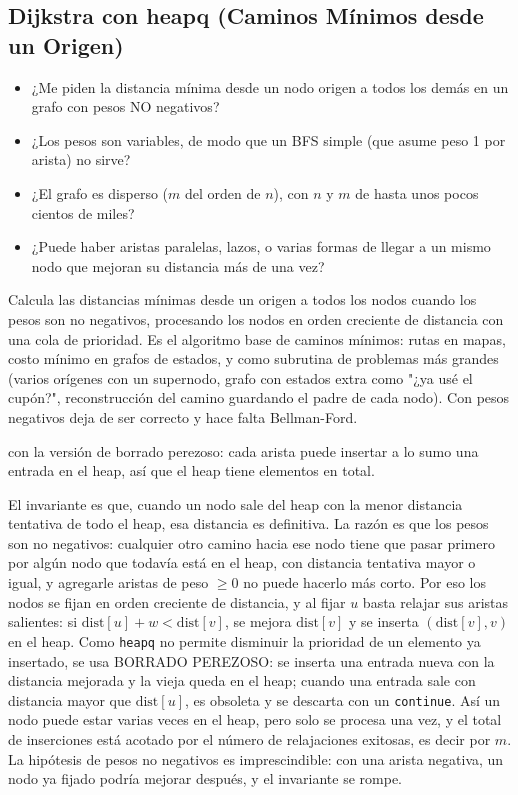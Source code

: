 \subsection{Dijkstra con heapq (Caminos Mínimos desde un Origen)}
\label{alg:4-10}


\begin{itemize}
\item ¿Me piden la distancia mínima desde un nodo origen a todos los demás en un grafo con pesos NO negativos?
\item ¿Los pesos son variables, de modo que un BFS simple (que asume peso 1 por arista) no sirve?
\item ¿El grafo es disperso ($m$ del orden de $n$), con $n$ y $m$ de hasta unos pocos cientos de miles?
\item ¿Puede haber aristas paralelas, lazos, o varias formas de llegar a un mismo nodo que mejoran su distancia más de una vez?
\end{itemize}

 Calcula las distancias mínimas desde un origen a todos los nodos cuando los pesos son no negativos, procesando los nodos en orden creciente de distancia con una cola de prioridad. Es el algoritmo base de caminos mínimos: rutas en mapas, costo mínimo en grafos de estados, y como subrutina de problemas más grandes (varios orígenes con un supernodo, grafo con estados extra como "¿ya usé el cupón?", reconstrucción del camino guardando el padre de cada nodo). Con pesos negativos deja de ser correcto y hace falta Bellman-Ford.

  con la versión de borrado perezoso: cada arista puede insertar a lo sumo una entrada en el heap, así que el heap tiene  elementos en total.

 El invariante es que, cuando un nodo sale del heap con la menor distancia tentativa de todo el heap, esa distancia es definitiva. La razón es que los pesos son no negativos: cualquier otro camino hacia ese nodo tiene que pasar primero por algún nodo que todavía está en el heap, con distancia tentativa mayor o igual, y agregarle aristas de peso $\ge 0$ no puede hacerlo más corto. Por eso los nodos se fijan en orden creciente de distancia, y al fijar $u$ basta relajar sus aristas salientes: si $\text{dist}[u] + w < \text{dist}[v]$, se mejora $\text{dist}[v]$ y se inserta $(\text{dist}[v], v)$ en el heap. Como \texttt{heapq} no permite disminuir la prioridad de un elemento ya insertado, se usa BORRADO PEREZOSO: se inserta una entrada nueva con la distancia mejorada y la vieja queda en el heap; cuando una entrada sale con distancia mayor que $\text{dist}[u]$, es obsoleta y se descarta con un \texttt{continue}. Así un nodo puede estar varias veces en el heap, pero solo se procesa una vez, y el total de inserciones está acotado por el número de relajaciones exitosas, es decir por $m$. La hipótesis de pesos no negativos es imprescindible: con una arista negativa, un nodo ya fijado podría mejorar después, y el invariante se rompe.~\cite{dijkstra1959}

